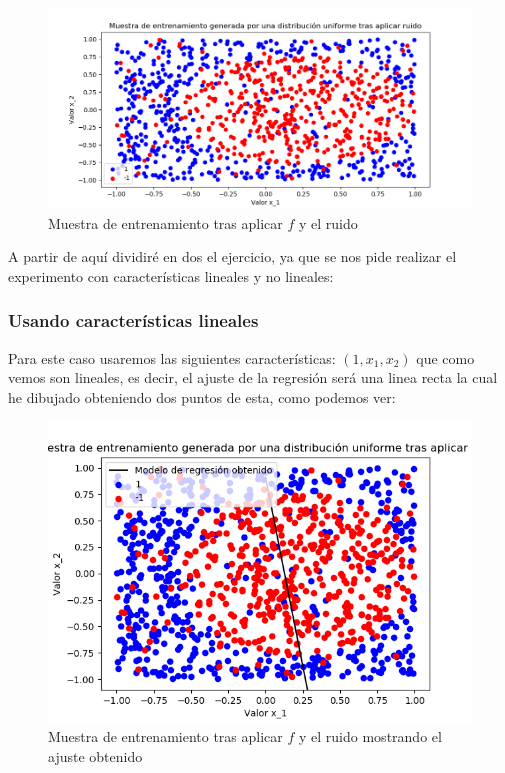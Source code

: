 \documentclass[12pt, spanish]{article}
\begin{document}
\begin{figure}[H]
  \centering
      \includegraphics[scale = 0.70]{muestra-f-r.png}
 		 \caption{Muestra de entrenamiento tras aplicar $f$ y el ruido}
  		\label{fig:ej2-2-m-f=r}

\end{figure}

A partir de aquí dividiré en dos el ejercicio, ya que se nos pide realizar el experimento con características lineales y no lineales:

\newpage

\subsubsection{Usando características lineales}

Para este caso usaremos las siguientes características: $(1, x_1, x_2)$ que como vemos son lineales, es decir, el ajuste de la regresión será una linea recta la cual he dibujado obteniendo dos puntos de esta, como podemos ver:


\begin{figure}[H]
  \centering
      \includegraphics[scale = 0.70]{muestra-f-r-1c.png}
 		 \caption{Muestra de entrenamiento tras aplicar $f$ y el ruido mostrando el ajuste obtenido}
  		\label{fig:ej2-2-m-f-r-1c}

\end{figure}
\end{document}

